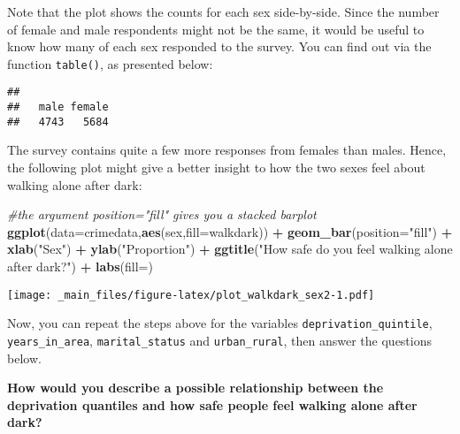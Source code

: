 \documentclass[
]{book}
\newenvironment{Shaded}{\begin{snugshade}}{\end{snugshade}}
\newcommand{\AttributeTok}[1]{\textcolor[rgb]{0.13,0.29,0.53}{#1}}
\newcommand{\CommentTok}[1]{\textcolor[rgb]{0.56,0.35,0.01}{\textit{#1}}}
\newcommand{\FunctionTok}[1]{\textcolor[rgb]{0.13,0.29,0.53}{\textbf{#1}}}
\newcommand{\NormalTok}[1]{#1}
\newcommand{\SpecialCharTok}[1]{\textcolor[rgb]{0.81,0.36,0.00}{\textbf{#1}}}
\newcommand{\StringTok}[1]{\textcolor[rgb]{0.31,0.60,0.02}{#1}}
\begin{document}
Note that the plot shows the counts for each sex side-by-side. Since the number of female and male respondents might not be the same, it would be useful to know how many of each sex responded to the survey. You can find out via the function \texttt{table()}, as presented below:

\begin{Shaded}
\end{Shaded}

\begin{verbatim}
## 
##   male female 
##   4743   5684
\end{verbatim}

The survey contains quite a few more responses from females than males. Hence, the following plot might give a better insight to how the two sexes feel about walking alone after dark:

\begin{Shaded}
\begin{Highlighting}[]
\CommentTok{\#the argument position="fill" gives you a stacked barplot}
\FunctionTok{ggplot}\NormalTok{(}\AttributeTok{data=}\NormalTok{crimedata,}\FunctionTok{aes}\NormalTok{(sex,}\AttributeTok{fill=}\NormalTok{walkdark)) }\SpecialCharTok{+} \FunctionTok{geom\_bar}\NormalTok{(}\AttributeTok{position=}\StringTok{"fill"}\NormalTok{) }\SpecialCharTok{+} \FunctionTok{xlab}\NormalTok{(}\StringTok{"Sex"}\NormalTok{) }\SpecialCharTok{+} \FunctionTok{ylab}\NormalTok{(}\StringTok{"Proportion"}\NormalTok{) }\SpecialCharTok{+} \FunctionTok{ggtitle}\NormalTok{(}\StringTok{"How safe do you feel walking alone after dark?"}\NormalTok{) }\SpecialCharTok{+} \FunctionTok{labs}\NormalTok{(}\AttributeTok{fill=}\StringTok{\textquotesingle{}\textquotesingle{}}\NormalTok{)}
\end{Highlighting}
\end{Shaded}

\texttt{[image: \_main\_files/figure-latex/plot\_walkdark\_sex2-1.pdf]}

Now, you can repeat the steps above for the variables \texttt{deprivation\_quintile}, \texttt{years\_in\_area}, \texttt{marital\_status} and \texttt{urban\_rural}, then answer the questions below.

\textbf{How would you describe a possible relationship between the deprivation quantiles and how safe people feel walking alone after dark?}
\end{document}

